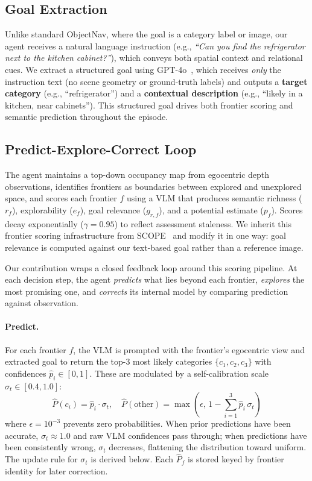 \documentclass[10pt,twocolumn,letterpaper]{article}
\begin{document}
\subsection{Goal Extraction}
\label{sec:problem}

Unlike standard ObjectNav, where the goal is a category label or image, our agent receives a natural language instruction (e.g., \emph{``Can you find the refrigerator next to the kitchen cabinet?''}), which conveys both spatial context and relational cues. We extract a structured goal using GPT-4o~\cite{openai2024gpt4o}, which receives \emph{only} the instruction text (no scene geometry or ground-truth labels) and outputs a \textbf{target category} (e.g., ``refrigerator'') and a \textbf{contextual description} (e.g., ``likely in a kitchen, near cabinets''). This structured goal drives both frontier scoring and semantic prediction throughout the episode.

\subsection{Predict-Explore-Correct Loop}
\label{sec:pec}

The agent maintains a top-down occupancy map from egocentric depth observations, identifies frontiers as boundaries between explored and unexplored space, and scores each frontier $f$ using a VLM that produces semantic richness ($r_f$), explorability ($e_f$), goal relevance ($g_{r,f}$), and a potential estimate ($p_f$). Scores decay exponentially ($\gamma = 0.95$) to reflect assessment staleness. We inherit this frontier scoring infrastructure from SCOPE~\cite{wang2026scope} and modify it in one way: goal relevance is computed against our text-based goal rather than a reference image.

Our contribution wraps a closed feedback loop around this scoring pipeline. At each decision step, the agent \emph{predicts} what lies beyond each frontier, \emph{explores} the most promising one, and \emph{corrects} its internal model by comparing prediction against observation.

\paragraph{Predict.} For each frontier $f$, the VLM is prompted with the frontier's egocentric view and extracted goal to return the top-3 most likely categories $\{c_1, c_2, c_3\}$ with confidences $\hat{p}_i \in [0,1]$. These are modulated by a self-calibration scale $\sigma_t \in [0.4, 1.0]$:
\begin{equation}
    \hat{P}(c_i) = \hat{p}_i \cdot \sigma_t, \quad
    \hat{P}(\text{other}) = \max\!\left(\epsilon,\, 1 - \textstyle\sum_{i=1}^{3} \hat{p}_i \, \sigma_t\right)
    \label{eq:predict}
\end{equation}
where $\epsilon = 10^{-3}$ prevents zero probabilities. When prior predictions have been accurate, $\sigma_t \approx 1.0$ and raw VLM confidences pass through; when predictions have been consistently wrong, $\sigma_t$ decreases, flattening the distribution toward uniform. The update rule for $\sigma_t$ is derived below. Each $\hat{P}_f$ is stored keyed by frontier identity for later correction.
\end{document}
